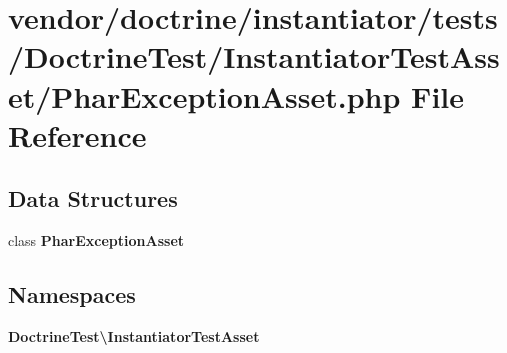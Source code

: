 \section{vendor/doctrine/instantiator/tests/\+Doctrine\+Test/\+Instantiator\+Test\+Asset/\+Phar\+Exception\+Asset.php File Reference}
\label{_phar_exception_asset_8php}
\subsection*{Data Structures}
\begin{DoxyCompactItemize}
\item 
class {\bf Phar\+Exception\+Asset}
\end{DoxyCompactItemize}
\subsection*{Namespaces}
\begin{DoxyCompactItemize}
\item 
 {\bf Doctrine\+Test\textbackslash{}\+Instantiator\+Test\+Asset}
\end{DoxyCompactItemize}
